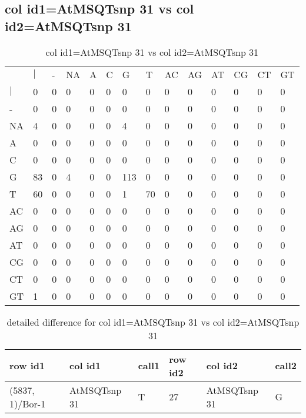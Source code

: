 \subsection{col id1=AtMSQTsnp 31 vs col id2=AtMSQTsnp 31}
\begin{center}
\begin{longtable}{|l|l|l|l|l|l|l|l|l|l|l|l|l|l|}
\caption{col id1=AtMSQTsnp 31 vs col id2=AtMSQTsnp 31} \label{table_dm842}\\
\hline
\\
\hline
&$|$&-&NA&A&C&G&T&AC&AG&AT&CG&CT&GT\\
$|$&0&0&0&0&0&0&0&0&0&0&0&0&0\\
-&0&0&0&0&0&0&0&0&0&0&0&0&0\\
NA&4&0&0&0&0&4&0&0&0&0&0&0&0\\
A&0&0&0&0&0&0&0&0&0&0&0&0&0\\
C&0&0&0&0&0&0&0&0&0&0&0&0&0\\
G&83&0&4&0&0&113&0&0&0&0&0&0&0\\
T&60&0&0&0&0&1&70&0&0&0&0&0&0\\
AC&0&0&0&0&0&0&0&0&0&0&0&0&0\\
AG&0&0&0&0&0&0&0&0&0&0&0&0&0\\
AT&0&0&0&0&0&0&0&0&0&0&0&0&0\\
CG&0&0&0&0&0&0&0&0&0&0&0&0&0\\
CT&0&0&0&0&0&0&0&0&0&0&0&0&0\\
GT&1&0&0&0&0&0&0&0&0&0&0&0&0\\
\hline
\end{longtable}
\end{center}

\begin{center}
\begin{longtable}{|l|l|l|l|l|l|}
\caption{detailed difference for col id1=AtMSQTsnp 31 vs col id2=AtMSQTsnp 31} \label{table_dm843}\\
\hline
row id1&col id1&call1&row id2&col id2&call2\\
\hline
(5837, 1)/Bor-1&AtMSQTsnp 31&T&27&AtMSQTsnp 31&G\\
\hline
\end{longtable}
\end{center}

